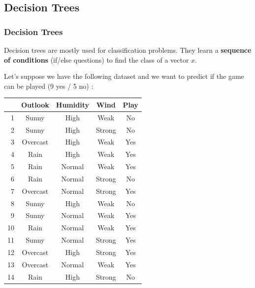 \documentclass{beamer}
\begin{document}
\subsection{Decision Trees}
\begin{frame}
  \frametitle{Decision Trees}
  Decision trees are mostly used for classification problems. They learn a
  \textbf{sequence of conditions} (if/else questions) to find the class of a vector
  $x$.

  Let's suppose we have the following dataset and we want to predict if the game
  can be played (9 yes / 5 no) :
  \begin{table}[htb]
    \centering
    \tiny
      \begin{tabular}{@{}rcccc@{}}
      \cmidrule{2-5}
         & Outlook  & Humidity & Wind   & Play\\
      \midrule
      1  & Sunny    & High     & Weak   & No  \\
      2  & Sunny    & High     & Strong & No  \\
      3  & Overcast & High     & Weak   & Yes \\
      4  & Rain     & High     & Weak   & Yes \\
      5  & Rain     & Normal   & Weak   & Yes \\
      6  & Rain     & Normal   & Strong & No  \\
      7  & Overcast & Normal   & Strong & Yes \\
      8  & Sunny    & High     & Weak   & No  \\
      9  & Sunny    & Normal   & Weak   & Yes \\
      10 & Rain     & Normal   & Weak   & Yes \\
      11 & Sunny    & Normal   & Strong & Yes \\
      12 & Overcast & High     & Strong & Yes \\
      13 & Overcast & Normal   & Weak   & Yes \\
      14 & Rain     & High     & Strong & No  \\
      \bottomrule
    \end{tabular}
    \normalsize
  \end{table}
\end{frame}
\end{document}
